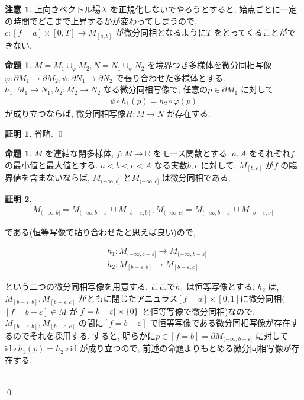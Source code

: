 \documentclass[10pt, fleqn, label-section=none]{bxjsarticle}
\theoremstyle{definition}
\newtheorem{prop}[dfn]{命題}
\newtheorem*{pf*}{証明}
\newtheorem{remark}[dfn]{注意}
\newcommand{\veps}{\varepsilon}
\newcommand{\cbra}[1]{\mleft\{#1\mright\}}
\renewcommand{\;}{\, ; \,}
\begin{document}
\begin{remark}
上向きベクトル場$X$ を正規化しないでやろうとすると, 始点ごとに一定の時間でどこまで上昇するかが変わってしまうので, $c: [f = a] \times [0, T] \rightarrow M_{[a,b]}$ が微分同相となるように$T$ をとってくることができない. 
\end{remark}

\begin{prop}
$M = M_1 \cup _\varphi M_2, N = N_1 \cup_\psi N_2$ を境界つき多様体を微分同相写像$\varphi: \partial M_1 \rightarrow \partial M_2, \psi: \partial N_1 \rightarrow \partial N_2$ で張り合わせた多様体とする. $h_1: M_1 \rightarrow N_1, h_2: M_2 \rightarrow N_2$ なる微分同相写像で, 任意の$p \in \partial M_1$ に対して
\begin{align*} \psi \circ h_1 (p) = h_2 \circ \varphi (p) \end{align*}
が成り立つならば, 微分同相写像$H: M \rightarrow N$ が存在する. 
\end{prop}
\begin{pf*}
省略. 
\qed
\end{pf*}



\begin{prop} $M$ を連結な閉多様体, $f: M \rightarrow \mathbb R$ をモース関数とする. $a, A$ をそれぞれ$f$ の最小値と最大値とする. $a < b < c < A$ なる実数$b, c$ に対して, $M_{[b,c]}$ が$f$ の臨界値を含まないならば, $M_{( - \infty, b]}$ と$M_{( - \infty, c]} $ は微分同相である. 

\end{prop}
\begin{pf*}

\begin{align*} M_{(-\infty, b] } = M_{(-\infty, b- \veps] } \cup M_{[b - \veps, b] }    , M_{(-\infty, c] } = M_{(-\infty, b- \veps] } \cup M_{[b - \veps, c] }   \end{align*}

である(恒等写像で貼り合わせたと思えば良い)ので, 

\begin{align*} & h_1  : M_{(-\infty, b- \veps] } \rightarrow M_{(-\infty, b- \veps] }  \\ & h_2 : M_{[b - \veps, b] }  \rightarrow  M_{[b - \veps, c] } \end{align*}

という二つの微分同相写像を用意する. ここで$h_1$ は恒等写像とする.  $h_2$ は,  $  M_{[b - \veps, b] },  M_{[b - \veps, c] }$ がともに閉じたアニュラス$[f =a] \times [0,1]$に微分同相($[f =b - \veps] \in M$ が$[f =b - \veps] \times \cbra{0}$ と恒等写像で微分同相)なので, $  M_{[b - \veps, b] },  M_{[b - \veps, c] }$ の間に$[f=b - \veps]$ で恒等写像である微分同相写像が存在するのでそれを採用する. すると, 明らかに$p \in [f = b] = \partial M_{(-\infty, b- \veps] }$ に対して$\textrm{id} \circ h_1 (p) = h_2 \circ \textrm{id}$ が成り立つので, 前述の命題よりもとめる微分同相写像が存在する. 

\begin{align*} \end{align*}

\qed
\end{pf*}
\end{document}
